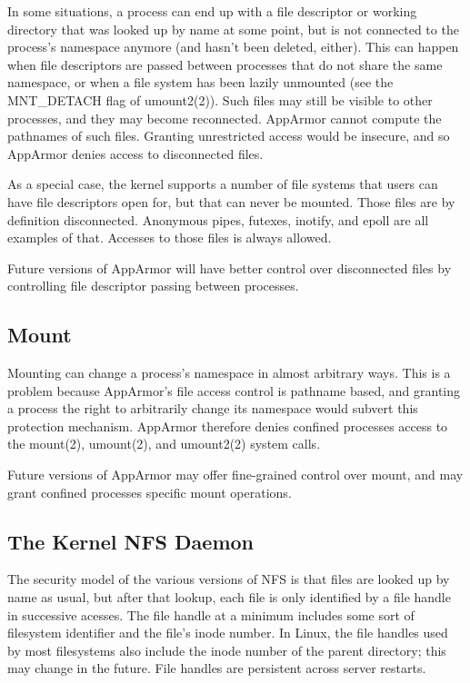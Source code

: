 \documentclass[a4paper]{article}
\begin{document}
In some situations, a process can end up with a file descriptor or
working directory that was looked up by name at some point, but is not
connected to the process's namespace anymore (and hasn't been deleted,
either).  This can happen when file descriptors are passed between
processes that do not share the same namespace, or when a file system
has been lazily unmounted (see the MNT\_DETACH flag of umount2(2)).  Such
files may still be visible to other processes, and they may become
reconnected.  AppArmor cannot compute the pathnames of such files.
Granting unrestricted access would be insecure, and so AppArmor denies
access to disconnected files.

As a special case, the kernel supports a number of file systems that
users can have file descriptors open for, but that can never be mounted.
Those files are by definition disconnected.  Anonymous pipes, futexes,
inotify, and epoll are all examples of that.  Accesses to those files
is always allowed.

Future versions of AppArmor will have better control over disconnected
files by controlling file descriptor passing between processes.


\subsection{Mount}

Mounting can change a process's namespace in almost arbitrary ways.
This is a problem because AppArmor's file access control is pathname
based, and granting a process the right to arbitrarily change its
namespace would subvert this protection mechanism.  AppArmor therefore
denies confined processes access to the mount(2), umount(2), and
umount2(2) system calls.

Future versions of AppArmor may offer fine-grained control over mount,
and may grant confined processes specific mount operations.


\subsection{The Kernel NFS Daemon}

The security model of the various versions of NFS is that files are
looked up by name as usual, but after that lookup, each file is only
identified by a file handle in successive acesses.  The file handle at a
minimum includes some sort of filesystem identifier and the file's inode
number.  In Linux, the file handles used by most filesystems also
include the inode number of the parent directory; this may change in the
future.  File handles are persistent across server restarts.
\end{document}

